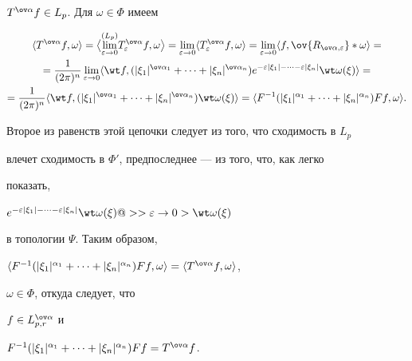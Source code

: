 \begin{pf}
$T^{\ov\alpha}f\in L_p$. Для $\omega\in\Phi$ имеем


\begin{multline}


\la T^{\ov\alpha}f,\omega\ra=\bigl\la


\overset{(L_p)}{\lim_{\varepsilon\to 0}}{}


T^{\ov\alpha}_\varepsilon f,\omega\bigr\ra=


\lim_{\varepsilon\to 0}\la T^{\ov\alpha}_\varepsilon f,\omega\ra=


\lim_{\varepsilon\to 0}\la f,\ov{R_{\ov\alpha,\varepsilon}}\ast


\omega\ra =\\


=\frac{1}{(2\pi)^n}\lim_{\varepsilon\to 0}


\la\wt f,(|\xi_1|^{\ov\alpha_1}+\dotsb+|\xi_n|^{\ov\alpha_n})


e^{-\varepsilon|\xi_1|-\dotsb-\varepsilon|\xi_n|}


\wt\omega(\xi)\ra= \\


=\frac{1}{(2\pi)^n}\la\wt f,


(|\xi_1|^{\ov\alpha_1}+\dotsb+|\xi_n|^{\ov\alpha_n})


\wt\omega(\xi)\ra=\la F^{-1}


(|\xi_1|^{\alpha_1}+\dotsb+|\xi_n|^{\alpha_n})Ff,\omega\ra.


\end{multline}


Второе из равенств этой цепочки следует из того, что сходимость в $L_p$


влечет сходимость в $\Phi'$, предпоследнее --- из того, что, как легко


показать,


$e^{-\varepsilon|\xi_1|-\dotsb-\varepsilon|\xi_n|}


\wt\omega(\xi)@>>{\varepsilon\to 0}>\wt\omega(\xi)$


в топологии $\Psi$. Таким образом,


$\la F^{-1}(|\xi_1|^{\alpha_1}+\dotsb+|\xi_n|^{\alpha_n})


Ff,\omega\ra=\la T^{\ov\alpha}f,\omega\ra$,


$\omega\in\Phi$, откуда следует, что


$f\in\spaceL$ и


$F^{-1}(|\xi_1|^{\alpha_1}+\dotsb+|\xi_n|^{\alpha_n})Ff=


T^{\ov\alpha}f$.


\end{pf}





